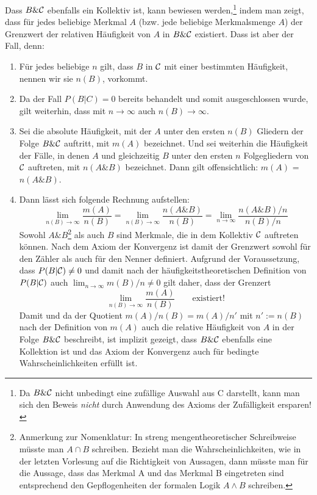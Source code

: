  Dass $B \& {\cal C}$ ebenfalls ein Kollektiv ist, kann bewiesen
 werden,\footnote{Da $B \& {\cal C}$ nicht unbedingt eine zufällige Auswahl
 aus {\cal C} darstellt, kann man sich den Beweis {\em nicht} durch Anwendung
 des Axioms der Zufälligkeit ersparen!} indem man zeigt, dass für jedes beliebige
 Merkmal $A$ (bzw. jede beliebige Merkmalsmenge $A$) der Grenzwert der relativen
 Häufigkeit von $A$ in $B \& {\cal C}$ existiert. Dass ist aber der Fall, denn:
 \begin{enumerate}
   \item Für jedes beliebige $n$ gilt, dass $B$ in ${\cal C}$ mit einer
   bestimmten Häufigkeit, nennen wir sie $n(B)$, vorkommt.
   \item Da der Fall $P(B|C)=0$ bereits behandelt und somit ausgeschlossen
   wurde, gilt weiterhin, dass mit $n\to\infty$ auch $n(B)\to\infty$.
   \item Sei die absolute Häufigkeit, mit der $A$ unter den ersten $n(B)$
   Gliedern der Folge $B \& {\cal C}$ auftritt, mit $m(A)$ bezeichnet. Und sei
   weiterhin die Häufigkeit der Fälle, in denen $A$ und gleichzeitig $B$ unter
   den ersten $n$ Folgegliedern von ${\cal C}$ auftreten, mit $n(A \& B)$
   bezeichnet. Dann gilt offensichtlich: $m(A)$ = $n(A \& B)$.
   \item Dann lässt sich folgende Rechnung aufstellen:
   \[ \lim_{n(B)\to\infty}\frac{m(A)}{n(B)} =
      \lim_{n(B)\to\infty}\frac{n(A \& B)}{n(B)} =
      \lim_{n\to\infty}\frac{n(A \& B)/n}{n(B)/n} \]
   Sowohl $A \& B$\footnote{Anmerkung zur Nomenklatur: In streng
   mengentheoretischer Schreibweise müsste man $A \cap B$ schreiben. Bezieht
   man die Wahrscheinlichkeiten, wie in der letzten Vorlesung auf die
   Richtigkeit von Aussagen, dann müsste man für die Aussage, dass das Merkmal
   A und das Merkmal B eingetreten sind entsprechend den Gepflogenheiten der
   formalen Logik $A \wedge B$ schreiben.} als auch $B$ sind Merkmale, die in
   dem Kollektiv ${\cal C}$ auftreten können. Nach dem Axiom der Konvergenz ist
   damit der Grenzwert sowohl für den Zähler als auch für den Nenner definiert.
   Aufgrund der Voraussetzung, dass $P(B|{\cal C}) \neq 0$ und damit nach der
   häufigkeitstheoretischen Definition von $P(B|{\cal C})$ auch
   $\lim_{n\to\infty}m(B)/n \neq 0$ gilt daher, dass der Grenzert
   \[ \lim_{n(B)\to\infty}\frac{m(A)}{n(B)} \qquad \mbox{existiert!}\]
   Damit und da der Quotient $m(A)/n(B) = m(A)/n'$ mit $n' := n(B)$ nach
   der Definition von $m(A)$ auch die relative Häufigkeit von $A$ in der Folge
   $B \& {\cal C}$ beschreibt, ist implizit gezeigt, dass $B \& {\cal C}$
   ebenfalls eine Kollektion ist und das Axiom der Konvergenz auch für bedingte
   Wahrscheinlichkeiten erfüllt ist. 
 \end{enumerate} 
  
